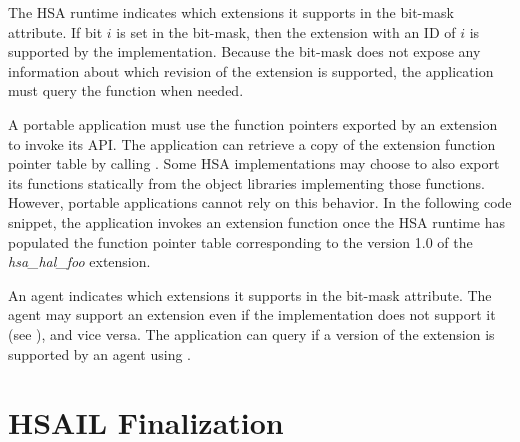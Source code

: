 \documentclass[oneside]{book}
\begin{document}
The HSA runtime indicates which extensions it supports in the
 bit-mask attribute. If bit $i$ is set in the
bit-mask, then the extension with an ID of $i$ is supported by the
implementation. Because the bit-mask does not expose any information about which
revision of the extension is supported, the application must query the function
 when needed.

A portable application must use the function pointers exported by an extension
to invoke its API. The application can retrieve a copy of the extension function
pointer table by calling . Some HSA
implementations may choose to also export its functions statically from the
object libraries implementing those functions. However, portable applications
cannot rely on this behavior. In the following code snippet, the application
invokes an extension function once the HSA runtime has populated the function
pointer table corresponding to the version 1.0 of the \textit{hsa_hal_foo}
extension.


An agent indicates which extensions it supports in the
 bit-mask attribute. The agent may support
an extension even if the implementation does not support it (see
), and vice versa. The application can query
if a version of the extension is supported by an agent using
.

\section{HSAIL Finalization}\label{sec:finalizer}
\end{document}
